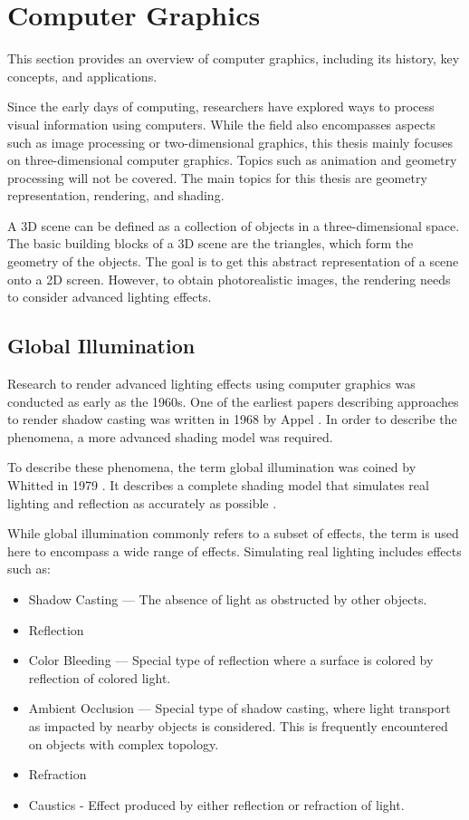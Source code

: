\section{Computer Graphics}
\label{ch:computerGraphics}

This section provides an overview of computer graphics, including its history, key concepts, and applications.

Since the early days of computing, researchers have explored ways to process visual information using computers. While the field also encompasses aspects such as image processing or two-dimensional graphics, this thesis mainly focuses on three-dimensional computer graphics. Topics such as animation and geometry processing will not be covered. The main topics for this thesis are geometry representation, rendering, and shading.

A 3D scene can be defined as a collection of objects in a three-dimensional space. The basic building blocks of a 3D scene are the triangles, which form the geometry of the objects. The goal is to get this abstract representation of a scene onto a 2D screen. However, to obtain photorealistic images, the rendering needs to consider advanced lighting effects.

\subsection{Global Illumination}

Research to render advanced lighting effects using computer graphics was conducted as early as the 1960s. One of the earliest papers describing approaches to render shadow casting was written in 1968 by Appel \cite{appel1968shading}. In order to describe the phenomena, a more advanced shading model was required.

To describe these phenomena, the term global illumination was coined by Whitted in 1979 \cite{whittedGlobalIllumination}. It describes a complete shading model that simulates real lighting and reflection as accurately as possible \cite{whitted2020OriginsOfGlobalIllumination}.

While global illumination commonly refers to a subset of effects, the term is used here to encompass a wide range of effects. Simulating real lighting includes effects such as:

\begin{itemize}
  \item{Shadow Casting} — The absence of light as obstructed by other objects.
  \item{Reflection}
  \item{Color Bleeding} — Special type of reflection where a surface is colored by reflection of colored light.
  \item{Ambient Occlusion} — Special type of shadow casting, where light transport as impacted by nearby objects is considered. This is frequently encountered on objects with complex topology.
  \item{Refraction}
  \item{Caustics} - Effect produced by either reflection or refraction of light.
\end{itemize}

